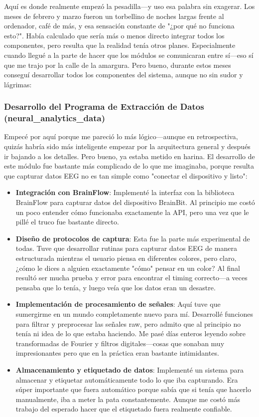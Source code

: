 Aquí es donde realmente empezó la pesadilla—y uso esa palabra sin exagerar. Los meses de febrero y marzo fueron un torbellino de noches largas frente al ordenador, café de más, y esa sensación constante de "¿por qué no funciona esto?". Había calculado que sería más o menos directo integrar todos los componentes, pero resulta que la realidad tenía otros planes. Especialmente cuando llegué a la parte de hacer que los módulos se comunicaran entre sí—eso sí que me trajo por la calle de la amargura. Pero bueno, durante estos meses conseguí desarrollar todos los componentes del sistema, aunque no sin sudor y lágrimas:

\subsubsection{Desarrollo del Programa de Extracción de Datos (neural\_analytics\_data)}

Empecé por aquí porque me pareció lo más lógico—aunque en retrospectiva, quizás habría sido más inteligente empezar por la arquitectura general y después ir bajando a los detalles. Pero bueno, ya estaba metido en harina. El desarrollo de este módulo fue bastante más complicado de lo que me imaginaba, porque resulta que capturar datos EEG no es tan simple como "conectar el dispositivo y listo":

\begin{itemize}
    \item \textbf{Integración con BrainFlow}: Implementé la interfaz con la biblioteca BrainFlow para capturar datos del dispositivo BrainBit. Al principio me costó un poco entender cómo funcionaba exactamente la API, pero una vez que le pillé el truco fue bastante directo.
    
    \item \textbf{Diseño de protocolos de captura}: Esta fue la parte más experimental de todas. Tuve que desarrollar rutinas para capturar datos EEG de manera estructurada mientras el usuario piensa en diferentes colores, pero claro, ¿cómo le dices a alguien exactamente "cómo" pensar en un color? Al final resultó ser mucha prueba y error para encontrar el timing correcto—a veces pensaba que lo tenía, y luego veía que los datos eran un desastre.
    
    \item \textbf{Implementación de procesamiento de señales}: Aquí tuve que sumergirme en un mundo completamente nuevo para mí. Desarrollé funciones para filtrar y preprocesar las señales raw, pero admito que al principio no tenía ni idea de lo que estaba haciendo. Me pasé días enteros leyendo sobre transformadas de Fourier y filtros digitales—cosas que sonaban muy impresionantes pero que en la práctica eran bastante intimidantes.
    
    \item \textbf{Almacenamiento y etiquetado de datos}: Implementé un sistema para almacenar y etiquetar automáticamente todo lo que iba capturando. Era súper importante que fuera automático porque sabía que si tenía que hacerlo manualmente, iba a meter la pata constantemente. Aunque me costó más trabajo del esperado hacer que el etiquetado fuera realmente confiable.
\end{itemize}

